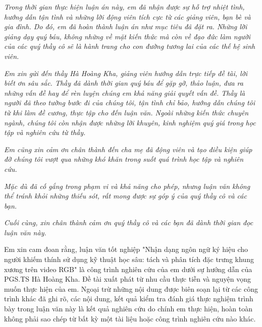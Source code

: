 

\newpage
{}
\thispagestyle{loi_cam_on}
\begin{center}
{}
\end{center}

\textit{Trong thời gian thực hiện luận án này, em đã nhận được sự hỗ trợ nhiệt tình, hướng dẫn tận tình và những lời động viên tích cực từ các giảng viên, bạn bè và gia đình. Do đó, em đã hoàn thành luận án như mục tiêu đã đặt ra. Những lời giảng dạy quý báu, không những về mặt kiến thức mà còn về đạo đức làm người của các quý thầy cô sẽ là hành trang cho con đường tương lai của các thế hệ sinh viên.}

\textit{Em xin gửi đến thầy Hà Hoàng Kha, giảng viên hướng dẫn trực tiếp đề tài, lời biết ơn sâu sắc. Thầy đã dành thời gian quý báu để gặp gỡ, thảo luận, đưa ra những vấn đề hay để rèn luyện chúng em khả năng giải quyết vấn đề. Thầy là người đã theo tường bước đi của chúng tôi, tận tình chỉ bảo, hướng dẫn chúng tôi từ khi làm đề cương, thực tập cho đến luận văn. Ngoài những kiến thức chuyên ngành, chúng tôi còn nhận được những lời khuyên, kinh nghiệm quý giá trong học tập và nghiên cứu từ thầy.}

\textit{Em cũng xin cảm ơn chân thành đến cha mẹ đã động viên và tạo điều kiện giúp đỡ chúng tôi vượt qua những khó khăn trong suốt quá trình học tập và nghiên cứu.}

\textit{Mặc dù đã cố gắng trong phạm vi và khả năng cho phép, nhưng luận văn không thể tránh khỏi những thiếu sót, rất mong được sự góp ý của quý thầy cô và các bạn.}

\textit{Cuối cùng, xin chân thành cảm ơn quý thầy cô và các bạn đã dành thời gian đọc luận văn này.}


\newpage
{}
\thispagestyle{loi_cam_doan}
\begin{center}
{}
\end{center}

\noindent Em xin cam đoan rằng, luận văn tốt nghiệp "Nhận dạng ngôn ngữ ký hiệu cho người khiếm thính sử dụng kỹ thuật học sâu: tách và phân tích đặc trưng khung xương trên video RGB" là công trình nghiên cứu của em dưới sự hướng dẫn của PGS.TS Hà Hoàng Kha. Đề tài xuất phát từ nhu cầu thực tiễn và nguyện vọng muốn thực hiện của em. Ngoại trừ những nội dung được biên soạn lại từ các công trình khác đã ghi rõ, các nội dung, kết quả kiểm tra đánh giá thực nghiệm trình bày trong luận văn này là kết quả nghiên cứu do chính em thực hiện, hoàn toàn không phải sao chép từ bất kỳ một tài liệu hoặc công trình nghiên cứu nào khác.

